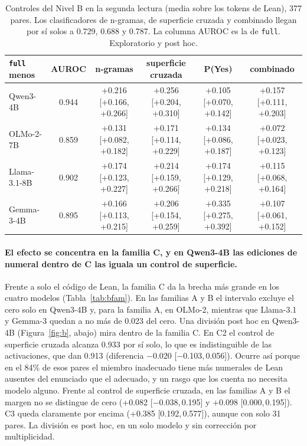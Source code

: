 \documentclass[10pt]{article}
\newcommand{\vr}[1]{\texttt{#1}}
\newcommand{\ic}[2]{[#1,\,#2]}
\begin{document}
\begin{table}[h]
\centering
\caption{Controles del Nivel B en la segunda lectura (media sobre los tokens de Lean), 377 pares. Los clasificadores de n-gramas, de superficie cruzada y combinado llegan por sí solos a 0.729, 0.688 y 0.787. La columna AUROC es la de \vr{full}. Exploratorio y post hoc.}
\label{tab:bcontroles2}
\vspace{2pt}
{\footnotesize\setlength{\tabcolsep}{2pt}
\begin{tabular}{@{}lccccc@{}}
\toprule
\vr{full} menos & AUROC & n-gramas & superficie cruzada & P(Yes) & combinado\\
\midrule
Qwen3-4B     & 0.944 & +0.216 [+0.166, +0.266] & +0.256 [+0.204, +0.310] & +0.105 [+0.070, +0.142] & +0.157 [+0.111, +0.203]\\
OLMo-2-7B    & 0.859 & +0.131 [+0.082, +0.182] & +0.171 [+0.114, +0.229] & +0.134 [+0.086, +0.187] & +0.072 [+0.023, +0.123]\\
Llama-3.1-8B & 0.902 & +0.174 [+0.123, +0.227] & +0.214 [+0.159, +0.266] & +0.174 [+0.129, +0.218] & +0.115 [+0.068, +0.164]\\
Gemma-3-4B   & 0.895 & +0.166 [+0.113, +0.215] & +0.206 [+0.154, +0.259] & +0.335 [+0.275, +0.392] & +0.107 [+0.061, +0.152]\\
\bottomrule
\end{tabular}}
\end{table}

\paragraph{El efecto se concentra en la familia C, y en Qwen3-4B las ediciones de numeral dentro de C las iguala un control de superficie.}
Frente a solo el código de Lean, la familia C da la brecha más grande en los cuatro modelos (Tabla~\ref{tab:bfam}). En las
familias A y B el intervalo excluye el cero solo en Qwen3-4B y, para la familia A, en OLMo-2, mientras que
Llama-3.1 y Gemma-3 quedan a no más de 0.023 del cero.
Una división post hoc en Qwen3-4B (Figura~\ref{fig:b}, abajo) mira dentro de la familia C. En C2 el control de superficie cruzada
alcanza 0.933 por sí solo, lo que es indistinguible de las activaciones, que dan 0.913 (diferencia −0.020
\ic{−0.103}{0.056}). Ocurre así porque en el 84\% de esos pares el miembro inadecuado tiene más numerales de Lean
ausentes del enunciado que el adecuado, y un rasgo que los cuenta no necesita modelo alguno. Frente al
control de superficie cruzada, en las familias A y B el margen no se distingue de cero (+0.082 \ic{−0.038}{0.195} y +0.098
\ic{0.000}{0.195}). C3 queda claramente por encima (+0.385 \ic{0.192}{0.577}), aunque con solo 31 pares. La
división es post hoc, en un solo modelo y sin corrección por multiplicidad.
\end{document}

